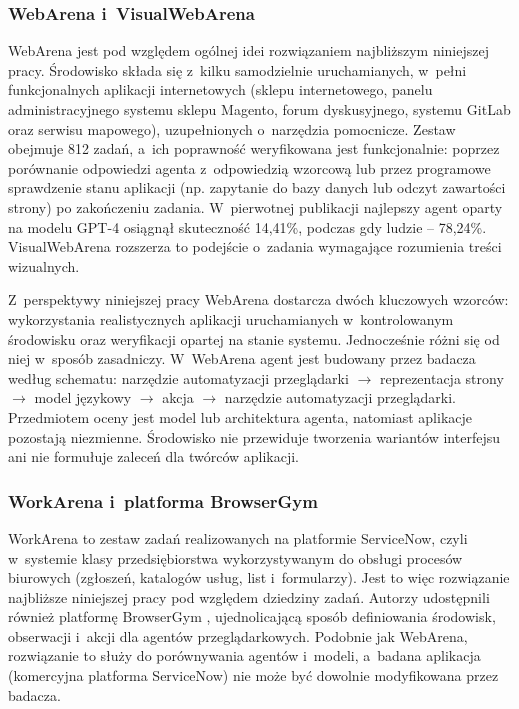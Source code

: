 \subsubsection{WebArena i~VisualWebArena}
WebArena \citep{zhou2024webarena} jest pod względem ogólnej idei rozwiązaniem najbliższym niniejszej pracy. Środowisko składa się z~kilku samodzielnie uruchamianych, w~pełni funkcjonalnych aplikacji internetowych (sklepu internetowego, panelu administracyjnego systemu sklepu Magento, forum dyskusyjnego, systemu GitLab oraz serwisu mapowego), uzupełnionych o~narzędzia pomocnicze. Zestaw obejmuje 812 zadań, a~ich poprawność weryfikowana jest funkcjonalnie: poprzez porównanie odpowiedzi agenta z~odpowiedzią wzorcową lub przez programowe sprawdzenie stanu aplikacji (np. zapytanie do bazy danych lub odczyt zawartości strony) po zakończeniu zadania. W~pierwotnej publikacji najlepszy agent oparty na modelu GPT-4 osiągnął skuteczność 14,41\%, podczas gdy ludzie -- 78,24\%. VisualWebArena \citep{koh2024visualwebarena} rozszerza to podejście o~zadania wymagające rozumienia treści wizualnych.

Z~perspektywy niniejszej pracy WebArena dostarcza dwóch kluczowych wzorców: wykorzystania realistycznych aplikacji uruchamianych w~kontrolowanym środowisku oraz weryfikacji opartej na stanie systemu. Jednocześnie różni się od niej w~sposób zasadniczy. W~WebArena agent jest budowany przez badacza według schematu: narzędzie automatyzacji przeglądarki $\rightarrow$ reprezentacja strony $\rightarrow$ model językowy $\rightarrow$ akcja $\rightarrow$ narzędzie automatyzacji przeglądarki. Przedmiotem oceny jest model lub architektura agenta, natomiast aplikacje pozostają niezmienne. Środowisko nie przewiduje tworzenia wariantów interfejsu ani nie formułuje zaleceń dla twórców aplikacji.

\subsubsection{WorkArena i~platforma BrowserGym}
WorkArena \citep{drouin2024workarena} to zestaw zadań realizowanych na platformie ServiceNow, czyli w~systemie klasy przedsiębiorstwa wykorzystywanym do obsługi procesów biurowych (zgłoszeń, katalogów usług, list i~formularzy). Jest to więc rozwiązanie najbliższe niniejszej pracy pod względem dziedziny zadań. Autorzy udostępnili również platformę BrowserGym \citep{chezelles2025browsergym}, ujednolicającą sposób definiowania środowisk, obserwacji i~akcji dla agentów przeglądarkowych. Podobnie jak WebArena, rozwiązanie to służy do porównywania agentów i~modeli, a~badana aplikacja (komercyjna platforma ServiceNow) nie może być dowolnie modyfikowana przez badacza.

